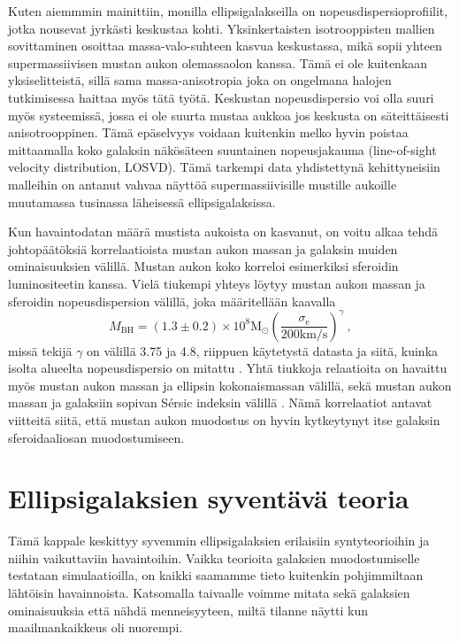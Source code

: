 \documentclass[12pt,a4paper]{article}
\begin{document}
Kuten aiemmmin mainittiin, monilla ellipsigalakseilla on nopeusdispersioprofiilit, jotka nousevat jyrkästi keskustaa kohti. Yksinkertaisten isotrooppisten mallien sovittaminen osoittaa massa-valo-suhteen kasvua keskustassa, mikä sopii yhteen supermassiivisen mustan aukon olemassaolon kanssa. Tämä ei ole kuitenkaan yksiselitteistä, sillä sama massa-anisotropia joka on ongelmana halojen tutkimisessa haittaa myös tätä työtä. Keskustan nopeusdispersio voi olla suuri myös systeemissä, jossa ei ole suurta mustaa aukkoa jos keskusta on säteittäisesti anisotrooppinen. Tämä epäselvyys voidaan kuitenkin melko hyvin poistaa mittaamalla koko galaksin näkösäteen suuntainen nopeusjakauma (line-of-sight velocity distribution, LOSVD). Tämä tarkempi data yhdistettynä kehittyneisiin malleihin on antanut vahvaa näyttöä supermassiivisille mustille aukoille muutamassa tusinassa läheisessä ellipsigalaksissa. 

Kun havaintodatan määrä mustista aukoista on kasvanut, on voitu alkaa tehdä johtopäätöksiä korrelaatioista mustan aukon massan ja galaksin muiden ominaisuuksien välillä. Mustan aukon koko korreloi esimerkiksi sferoidin luminositeetin kanssa. Vielä tiukempi yhteys löytyy mustan aukon massan ja sferoidin nopeusdispersion välillä, joka määritellään kaavalla 
\begin{equation}
M_{\mathrm{BH}} = (1.3 \pm 0.2 ) \times 10^8 \mathrm{M_\odot} \left( \frac{\sigma_\mathrm{e}}{200 \mathrm{km/s}} \right)^\gamma \ ,
\end{equation}
missä tekijä $\gamma$ on välillä 3.75 ja 4.8, riippuen käytetystä datasta ja siitä, kuinka isolta alueelta nopeusdispersio on mitattu \citep{gebhardt:2000, ferrarese:2000}. Yhtä tiukkoja relaatioita on havaittu myös mustan aukon massan ja ellipsin kokonaismassan välillä, sekä mustan aukon massan \citep{haring:2004} ja galaksiin sopivan Sérsic indeksin välillä \citep{graham:2001}. Nämä korrelaatiot antavat viitteitä siitä, että mustan aukon muodostus on hyvin kytkeytynyt itse galaksin sferoidaaliosan muodostumiseen.

\section{Ellipsigalaksien syventävä teoria}

Tämä kappale keskittyy syvemmin ellipsigalaksien erilaisiin syntyteorioihin ja niihin vaikuttaviin havaintoihin. Vaikka teorioita galaksien muodostumiselle testataan simulaatioilla, on kaikki saamamme tieto kuitenkin pohjimmiltaan lähtöisin havainnoista. Katsomalla taivaalle voimme mitata sekä galaksien ominaisuuksia että nähdä menneisyyteen, miltä tilanne näytti kun maailmankaikkeus oli nuorempi. 
\end{document}
